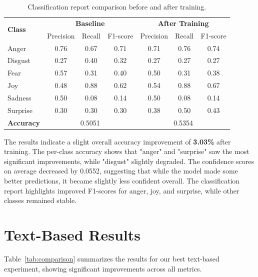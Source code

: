 \begin{table}[ht]
    \centering
    \begin{tabular}{lccc|ccc}
        \hline
        \multirow{2}{*}{\textbf{Class}} & \multicolumn{3}{c|}{\textbf{Baseline}} & \multicolumn{3}{c}{\textbf{After Training}} \\
        & Precision & Recall & F1-score & Precision & Recall & F1-score \\
        \hline
        Anger & 0.76 & 0.67 & 0.71 & 0.71 & 0.76 & 0.74 \\
        Disgust & 0.27 & 0.40 & 0.32 & 0.27 & 0.27 & 0.27 \\
        Fear & 0.57 & 0.31 & 0.40 & 0.50 & 0.31 & 0.38 \\
        Joy & 0.48 & 0.88 & 0.62 & 0.54 & 0.88 & 0.67 \\
        Sadness & 0.50 & 0.08 & 0.14 & 0.50 & 0.08 & 0.14 \\
        Surprise & 0.30 & 0.30 & 0.30 & 0.38 & 0.50 & 0.43 \\
        \hline
        \textbf{Accuracy} & \multicolumn{3}{c|}{0.5051} & \multicolumn{3}{c}{0.5354} \\
        \hline
    \end{tabular}
    \caption{Classification report comparison before and after training.}
    \label{tab:classification_report}
\end{table}

The results indicate a slight overall accuracy improvement of \textbf{3.03\%} after training. The per-class accuracy shows that "anger" and "surprise" saw the most significant improvements, while "disgust" slightly degraded. The confidence scores on average decreased by 0.0552, suggesting that while the model made some better predictions, it became slightly less confident overall. The classification report highlights improved F1-scores for anger, joy, and surprise, while other classes remained stable.


\section{Text-Based Results}
\label{sec:text-results}

Table~\ref{tab:comparison} summarizes the results for our best text-based experiment, showing significant improvements across all metrics.
\newline

